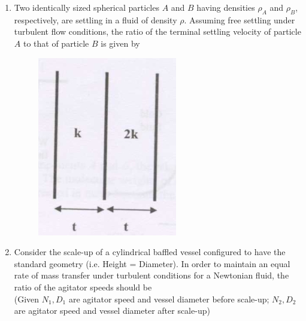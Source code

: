 \documentclass[journal,12pt,onecolumn]{IEEEtran}
\theoremstyle{remark}
\begin{document}
\begin{enumerate}
\item Two identically sized spherical particles $A$ and $B$ having densities $\rho_A$ and $\rho_B$, respectively, are settling in a fluid of density $\rho$. Assuming free settling under turbulent flow conditions, the ratio of the terminal settling velocity of particle $A$ to that of particle $B$ is given by
\begin{figure}[H]
\centering
\includegraphics[width=0.25\columnwidth]{figs/qn43.jpg}
\caption{}
\label{fig:qn43.jpg}
\end{figure}
\hfill{}
\begin{enumerate}[label=(\Alph*)]
\end{enumerate}

\item Consider the scale-up of a cylindrical baffled vessel configured to have the standard geometry (i.e. Height = Diameter). In order to maintain an equal rate of mass transfer under turbulent conditions for a Newtonian fluid, the ratio of the agitator speeds should be \\
(Given $N_1, D_1$ are agitator speed and vessel diameter before scale-up; $N_2, D_2$ are agitator speed and vessel diameter after scale-up)
\hfill{}
\begin{enumerate}[label=(\Alph*)]
\end{enumerate}


\end{enumerate}
\end{document}
